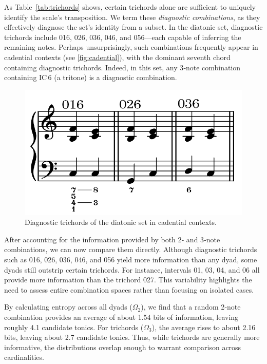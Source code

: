 \documentclass[10pt,twocolumn]{article}
\numberwithin{equation}{section} %
\begin{document}
    As Table~\ref{tab:trichords} shows, certain trichords alone are sufficient to uniquely identify the scale's transposition.
    We term these \textit{diagnostic combinations}, as they effectively diagnose the set's identity from a subset.
    In the diatonic set, diagnostic trichords include 016, 026, 036, 046, and 056—each capable of inferring the remaining notes.
    Perhaps unsurprisingly, such combinations frequently appear in cadential contexts (see \autoref{fig:cadential}), with the dominant seventh chord containing diagnostic trichords.
    Indeed, in this set, any 3‑note combination containing IC\,6 (a tritone) is a diagnostic combination.
    \begin{figure}[htbp]
        \centering
        \includegraphics[width=\linewidth]{figures/cadential}%
        \caption{Diagnostic trichords of the diatonic set in cadential contexts.}
        \label{fig:cadential}
    \end{figure}

    After accounting for the information provided by both 2‑ and 3‑note combinations, we can now compare them directly.
    Although diagnostic trichords such as 016, 026, 036, 046, and 056 yield more information than any dyad, some dyads still outstrip certain trichords.
    For instance, intervals 01, 03, 04, and 06 all provide more information than the trichord 027.
    This variability highlights the need to assess entire combination spaces rather than focusing on isolated cases.

    By calculating entropy across all dyads ($\Omega_2$), we find that a random 2‑note combination provides an average of about 1.54 bits of information, leaving roughly 4.1 candidate tonics.
    For trichords ($\Omega_3$), the average rises to about 2.16 bits, leaving about 2.7 candidate tonics.
    Thus, while trichords are generally more informative, the distributions overlap enough to warrant comparison across cardinalities.
\end{document}
